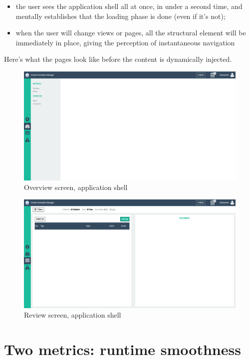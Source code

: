 \documentclass[12pt,svgnames]{memoir}
\begin{document}
\begin{itemize}
\itemsep1pt\parskip0pt
\item
  the user sees the application shell all at once, in under a second
  time, and mentally establishes that the loading phase is done (even if
  it's not);
\item
  when the user will change views or pages, all the structural element
  will be immediately in place, giving the perception of instantaneous
  navigation
\end{itemize}

Here's what the pages look like before the content is dynamically
injected.

\begin{figure}[htbp]
\centering
\includegraphics{./src/img/overview-appshell.png}
\caption{Overview screen, application shell}
\end{figure}

\begin{figure}[htbp]
\centering
\includegraphics{./src/img/review-appshell.png}
\caption{Review screen, application shell}
\end{figure}

\section{Two metrics: runtime
smoothness}\label{two-metrics-runtime-smoothness}
\end{document}
